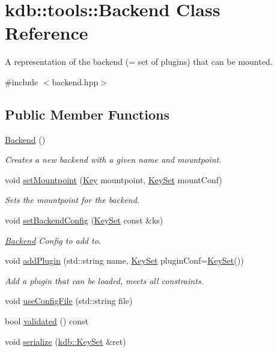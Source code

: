 \hypertarget{classkdb_1_1tools_1_1Backend}{\section{kdb\+:\+:tools\+:\+:Backend Class Reference}
\label{classkdb_1_1tools_1_1Backend}
}


A representation of the backend (= set of plugins) that can be mounted.  




{\ttfamily \#include $<$backend.\+hpp$>$}

\subsection*{Public Member Functions}
\begin{DoxyCompactItemize}
\item 
\hyperlink{classkdb_1_1tools_1_1Backend_a1650b149ebf313ee8cd3472247212263}{Backend} ()
\begin{DoxyCompactList}\small\item\em Creates a new backend with a given name and mountpoint. \end{DoxyCompactList}\item 
void \hyperlink{classkdb_1_1tools_1_1Backend_ac61b2628800a6fd0a6620ff47bfb3be9}{set\+Mountpoint} (\hyperlink{classkdb_1_1Key}{Key} mountpoint, \hyperlink{classkdb_1_1KeySet}{Key\+Set} mount\+Conf)
\begin{DoxyCompactList}\small\item\em Sets the mountpoint for the backend. \end{DoxyCompactList}\item 
void \hyperlink{classkdb_1_1tools_1_1Backend_aa7aa17a1c97cdfa48bcebadb7bc00247}{set\+Backend\+Config} (\hyperlink{classkdb_1_1KeySet}{Key\+Set} const \&ks)
\begin{DoxyCompactList}\small\item\em \hyperlink{classkdb_1_1tools_1_1Backend}{Backend} Config to add to. \end{DoxyCompactList}\item 
void \hyperlink{classkdb_1_1tools_1_1Backend_ab9926bd1bbbc095b09a0a6666058cd05}{add\+Plugin} (std\+::string name, \hyperlink{classkdb_1_1KeySet}{Key\+Set} plugin\+Conf=\hyperlink{classkdb_1_1KeySet}{Key\+Set}())
\begin{DoxyCompactList}\small\item\em Add a plugin that can be loaded, meets all constraints. \end{DoxyCompactList}\item 
void \hyperlink{classkdb_1_1tools_1_1Backend_a5c72747e5419d7802849cfc2eb4064d2}{use\+Config\+File} (std\+::string file)
\item 
bool \hyperlink{classkdb_1_1tools_1_1Backend_ad2b145e2ac9a4f276714d0d982583e03}{validated} () const 
\item 
void \hyperlink{classkdb_1_1tools_1_1Backend_a93638ae12d8880bdb528ae709c857be7}{serialize} (\hyperlink{classkdb_1_1KeySet}{kdb\+::\+Key\+Set} \&ret)
\end{DoxyCompactItemize}


